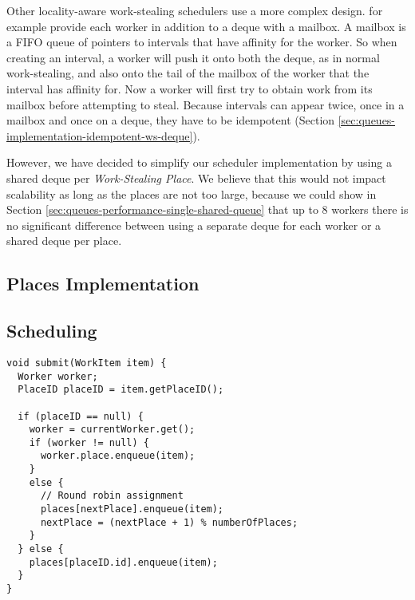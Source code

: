 Other locality-aware work-stealing schedulers use a more complex
design. \textcite{Acar2002} for example provide each worker in
addition to a deque with a mailbox. A mailbox is a FIFO queue of
pointers to intervals that have affinity for the worker. So when
creating an interval, a worker will push it onto both the deque, as in
normal work-stealing, and also onto the tail of the mailbox of the
worker that the interval has affinity for. Now a worker will first try
to obtain work from its mailbox before attempting to steal. Because
intervals can appear twice, once in a mailbox and once on a deque,
they have to be idempotent (Section
\ref{sec:queues-implementation-idempotent-ws-deque}).

However, we have decided to simplify our scheduler implementation by
using a shared deque per \emph{Work-Stealing Place}. We believe that
this would not impact scalability as long as the places are not too
large, because we could show in Section
\ref{sec:queues-performance-single-shared-queue} that up to 8 workers
there is no significant difference between using a separate deque for
each worker or a shared deque per place.

\subsection{Places Implementation}
\label{sec:locality-implementation-work-stealing-places-implementation}








\subsection{Scheduling}
\label{sec:locality-implementation-work-stealing-places-scheduling}


\begin{lstlisting}[style=FloatNumbers,
  caption={TODO},
  label=lst:locality-implementation-submit]
void submit(WorkItem item) {
  Worker worker;
  PlaceID placeID = item.getPlaceID();
    
  if (placeID == null) {
    worker = currentWorker.get();
    if (worker != null) {
      worker.place.enqueue(item);
    }
    else {
      // Round robin assignment
      places[nextPlace].enqueue(item);
      nextPlace = (nextPlace + 1) % numberOfPlaces;
    }
  } else {
    places[placeID.id].enqueue(item);
  }
}
\end{lstlisting}

